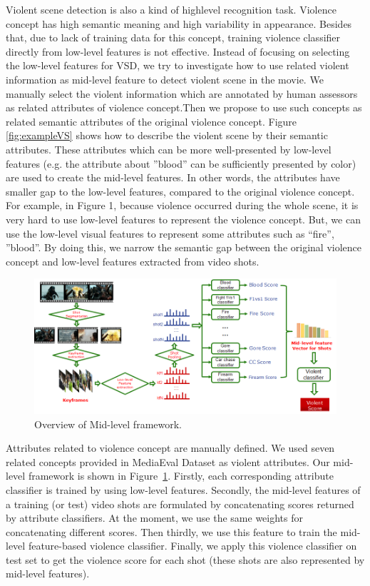\documentclass[review]{elsarticle}
\begin{document}
Violent scene detection is also a kind of highlevel recognition task. Violence concept has high semantic meaning and high
variability in appearance. Besides that, due to lack of training data for this concept, training violence classifier directly
from low-level features is not effective. Instead of focusing on selecting the low-level features for VSD, we try to investigate how to use related violent information as mid-level feature to detect violent scene in the movie. We manually select the violent information which are annotated by human assessors as related attributes of violence concept.Then we propose to use such concepts as related semantic attributes of the original violence concept. Figure \ref{fig:exampleVS} shows how to describe the violent scene by their semantic attributes. These attributes which can be more well-presented by low-level features (e.g. the attribute about ”blood” can be sufficiently presented by color) are used to create the mid-level features. In other words, the attributes have smaller gap to the low-level features, compared to the original violence concept. For example, in Figure 1, because violence occurred during the whole scene, it is very hard to use low-level features to represent the violence concept. But, we can use the low-level visual features to represent some attributes such as “fire”, ”blood”. By doing this, we narrow the semantic gap between the original violence concept and low-level features extracted from video shots.
\begin{figure}[!t]
	\centering
	\includegraphics[width=1\linewidth]{Images/Mid-level.png}
	\caption{Overview of Mid-level framework.}
	\label{fig:mid-level}
\end{figure}
Attributes related to violence concept are manually defined. We used seven related concepts provided in MediaEval Dataset as violent attributes. Our mid-level framework is shown in Figure~\ref{fig:mid-level}. Firstly, each corresponding attribute classifier is trained by using low-level features. Secondly, the mid-level features of a training (or test) video shots are formulated by concatenating scores returned by attribute classifiers. At the moment, we use the same weights for concatenating different scores. Then thirdly, we use this feature to train the mid-level feature-based violence classifier.  Finally, we apply this violence classifier on test set to get the violence score for each shot (these shots are also represented by mid-level features).
\end{document}
